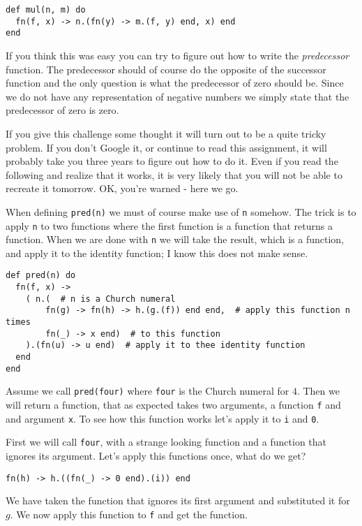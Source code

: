 \documentclass[a4paper,11pt]{article}
\begin{document}
\begin{verbatim}
def mul(n, m) do
  fn(f, x) -> n.(fn(y) -> m.(f, y) end, x) end
end
\end{verbatim}

If you think this was easy you can try to figure out how to write the
{\em predecessor} function. The predecessor should of course do the
opposite of the successor function and the only question is what the
predecessor of zero should be. Since we do not have any representation
of negative numbers we simply state that the predecessor of zero is
zero.

If you give this challenge some thought it will turn out to be a quite
tricky problem. If you don't Google it, or continue to read this
assignment, it will probably take you three years to figure out how to
do it. Even if you read the following and realize that it works, it is
very likely that you will not be able to recreate it tomorrow. OK,
you're warned - here we go.

When defining {\tt pred(n)} we must of course make use of {\tt n}
somehow. The trick is to apply {\tt n} to two functions where the
first function is a function that returns a function. When we are done
with {\tt n} we will take the result, which is a function, and apply it
to the identity function; I know this does not make sense.

\begin{verbatim}
def pred(n) do
  fn(f, x) ->
    ( n.(  # n is a Church numeral
        fn(g) -> fn(h) -> h.(g.(f)) end end,  # apply this function n times 
        fn(_) -> x end)  # to this function 
    ).(fn(u) -> u end)  # apply it to thee identity function
  end
end
\end{verbatim}

Assume we call {\tt pred(four)} where {\tt four} is the Church numeral
for $4$. Then we will return a function, that as expected takes two
arguments, a function {\tt f} and and argument {\tt x}. To see how
this function works let's apply it to {\tt i} and {\tt 0}.

First we will call {\tt four}, with a strange looking function and a
function that ignores its argument. Let's apply this functions once,
what do we get?

\begin{verbatim}
fn(h) -> h.((fn(_) -> 0 end).(i)) end
\end{verbatim}

We have taken the function that ignores its first argument and
substituted it for $g$. We now apply this function to {\tt f} and get
the function.
\end{document}
